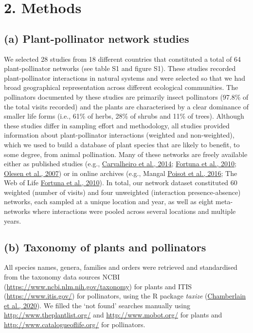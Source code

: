 \documentclass[
  12pt,
  a4paper,
]{article}
\begin{document}
\hypertarget{methods}{%
\section{2. Methods}\label{methods}}

\hypertarget{a-plant-pollinator-network-studies}{%
\subsection{(a) Plant-pollinator network studies}\label{a-plant-pollinator-network-studies}}

We selected 28 studies from 18 different countries that constituted a total of 64 plant-pollinator networks (see table S1 and figure S1). These studies recorded plant-pollinator interactions in natural systems and were selected so that we had broad geographical representation across different ecological communities. The pollinators documented by these studies are primarily insect pollinators (97.8\% of the total visits recorded) and the plants are characterised by a clear dominance of smaller life forms (i.e., 61\% of herbs, 28\% of shrubs and 11\% of trees). Although these studies differ in sampling effort and methodology, all studies provided information about plant-pollinator interactions (weighted and non-weighted), which we used to build a database of plant species that are likely to benefit, to some degree, from animal pollination. Many of these networks are freely available either as published studies (e.g., \protect\hyperlink{ref-carvalheiro2014}{Carvalheiro et al., 2014}; \protect\hyperlink{ref-fortuna2010}{Fortuna et al., 2010}; \protect\hyperlink{ref-olesen2007}{Olesen et al., 2007}) or in online archives (e.g., Mangal \protect\hyperlink{ref-poisot2016}{Poisot et al., 2016}; The Web of Life \protect\hyperlink{ref-fortuna2010}{Fortuna et al., 2010}). In total, our network dataset constituted 60 weighted (number of visits) and four unweighted (interaction presence-absence) networks, each sampled at a unique location and year, as well as eight meta-networks where interactions were pooled across several locations and multiple years.

\hypertarget{b-taxonomy-of-plants-and-pollinators}{%
\subsection{(b) Taxonomy of plants and pollinators}\label{b-taxonomy-of-plants-and-pollinators}}

All species names, genera, families and orders were retrieved and standardised from the taxonomy data sources NCBI (\url{https://www.ncbi.nlm.nih.gov/taxonomy}) for plants and ITIS (\url{https://www.itis.gov/}) for pollinators, using the R package \emph{taxize} (\protect\hyperlink{ref-chamberlain2020}{Chamberlain et al., 2020}). We filled the `not found' searches manually using \url{http://www.theplantlist.org/} and \url{http://www.mobot.org/} for plants and \url{http://www.catalogueoflife.org/} for pollinators.
\end{document}
